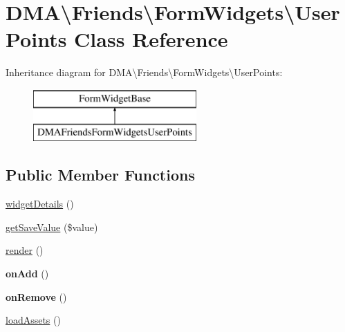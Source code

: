 \hypertarget{classDMA_1_1Friends_1_1FormWidgets_1_1UserPoints}{\section{D\+M\+A\textbackslash{}Friends\textbackslash{}Form\+Widgets\textbackslash{}User\+Points Class Reference}
\label{classDMA_1_1Friends_1_1FormWidgets_1_1UserPoints}
}
Inheritance diagram for D\+M\+A\textbackslash{}Friends\textbackslash{}Form\+Widgets\textbackslash{}User\+Points\+:\begin{figure}[H]
\begin{center}
\leavevmode
\includegraphics[height=2.000000cm]{d8/df1/classDMA_1_1Friends_1_1FormWidgets_1_1UserPoints}
\end{center}
\end{figure}
\subsection*{Public Member Functions}
\begin{DoxyCompactItemize}
\item 
\hyperlink{classDMA_1_1Friends_1_1FormWidgets_1_1UserPoints_a2f5e6b76ab55e44a579486785b7b41c7}{widget\+Details} ()
\item 
\hyperlink{classDMA_1_1Friends_1_1FormWidgets_1_1UserPoints_afc3a3971957b5aa008327001f195979f}{get\+Save\+Value} (\$value)
\item 
\hyperlink{classDMA_1_1Friends_1_1FormWidgets_1_1UserPoints_a910893df29c6c508ced5d84185d22bcb}{render} ()
\item 
\hypertarget{classDMA_1_1Friends_1_1FormWidgets_1_1UserPoints_a19e5e2cce310f6c8547f7b50f42c1d0f}{{\bfseries on\+Add} ()}\label{classDMA_1_1Friends_1_1FormWidgets_1_1UserPoints_a19e5e2cce310f6c8547f7b50f42c1d0f}

\item 
\hypertarget{classDMA_1_1Friends_1_1FormWidgets_1_1UserPoints_a645fcb235fd962cd346978a10b892dcb}{{\bfseries on\+Remove} ()}\label{classDMA_1_1Friends_1_1FormWidgets_1_1UserPoints_a645fcb235fd962cd346978a10b892dcb}

\item 
\hyperlink{classDMA_1_1Friends_1_1FormWidgets_1_1UserPoints_adbaf2876c58fc27d29147c94893696b1}{load\+Assets} ()
\end{DoxyCompactItemize}


